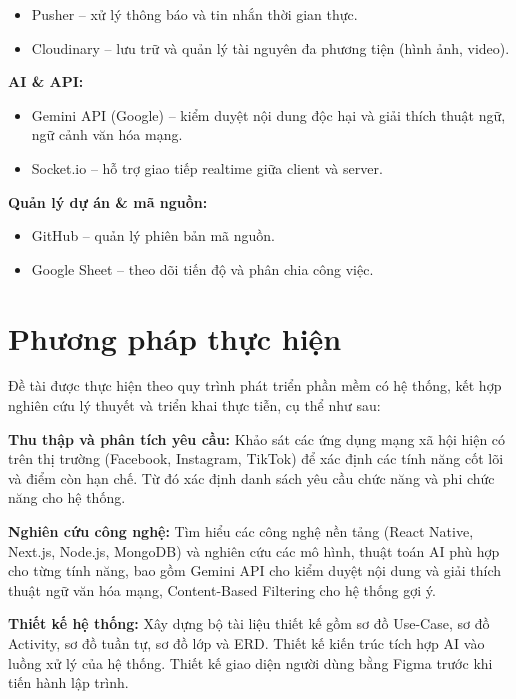 \begin{itemize}
\item
  Pusher -- xử lý thông báo và tin nhắn thời gian thực.
\item
  Cloudinary -- lưu trữ và quản lý tài nguyên đa phương tiện (hình ảnh,
  video).
\end{itemize}

\textbf{AI \& API:}

\begin{itemize}
\item
  Gemini API (Google) -- kiểm duyệt nội dung độc hại và giải thích thuật
  ngữ, ngữ cảnh văn hóa mạng.
\item
  Socket.io -- hỗ trợ giao tiếp realtime giữa client và server.
\end{itemize}

\textbf{Quản lý dự án \& mã nguồn:}

\begin{itemize}
\item
  GitHub -- quản lý phiên bản mã nguồn.
\item
  Google Sheet -- theo dõi tiến độ và phân chia công việc.
\end{itemize}

\section{Phương pháp thực
hiện}\label{phux1b0ux1a1ng-phuxe1p-thux1ef1c-hiux1ec7n}

Đề tài được thực hiện theo quy trình phát triển phần mềm có hệ thống,
kết hợp nghiên cứu lý thuyết và triển khai thực tiễn, cụ thể như sau:

\textbf{Thu thập và phân tích yêu cầu:} Khảo sát các ứng dụng mạng xã
hội hiện có trên thị trường (Facebook, Instagram, TikTok) để xác định
các tính năng cốt lõi và điểm còn hạn chế. Từ đó xác định danh sách yêu
cầu chức năng và phi chức năng cho hệ thống.

\textbf{Nghiên cứu công nghệ:} Tìm hiểu các công nghệ nền tảng (React
Native, Next.js, Node.js, MongoDB) và nghiên cứu các mô hình, thuật toán
AI phù hợp cho từng tính năng, bao gồm Gemini API cho kiểm duyệt nội
dung và giải thích thuật ngữ văn hóa mạng, Content-Based Filtering cho
hệ thống gợi ý.

\textbf{Thiết kế hệ thống:} Xây dựng bộ tài liệu thiết kế gồm sơ đồ
Use-Case, sơ đồ Activity, sơ đồ tuần tự, sơ đồ lớp và ERD. Thiết kế kiến
trúc tích hợp AI vào luồng xử lý của hệ thống. Thiết kế giao diện người
dùng bằng Figma trước khi tiến hành lập trình.

